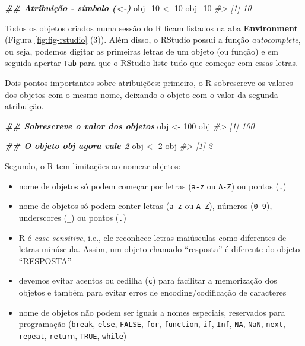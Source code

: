 \documentclass[
]{book}
\newenvironment{Shaded}{\begin{snugshade}}{\end{snugshade}}
\newcommand{\CommentTok}[1]{\textcolor[rgb]{0.37,0.37,0.37}{\textit{#1}}}
\newcommand{\DecValTok}[1]{\textcolor[rgb]{0.06,0.06,0.06}{#1}}
\newcommand{\DocumentationTok}[1]{\textcolor[rgb]{0.37,0.37,0.37}{\textbf{\textit{#1}}}}
\newcommand{\NormalTok}[1]{#1}
\newcommand{\OtherTok}[1]{\textcolor[rgb]{0.37,0.37,0.37}{#1}}
\providecommand{\tightlist}{%
  \setlength{\itemsep}{0pt}\setlength{\parskip}{0pt}}
\begin{document}
\begin{Shaded}
\begin{Highlighting}[]
\DocumentationTok{\#\# Atribuição {-} símbolo (\textless{}{-})}
\NormalTok{obj\_10 }\OtherTok{\textless{}{-}} \DecValTok{10}
\NormalTok{obj\_10}
\CommentTok{\#\textgreater{} [1] 10}
\end{Highlighting}
\end{Shaded}

Todos os objetos criados numa sessão do R ficam listados na aba \textbf{Environment} (Figura \ref{fig:fig-rstudio} (3)). Além disso, o RStudio possui a função \emph{autocomplete}, ou seja, podemos digitar as primeiras letras de um objeto (ou função) e em seguida apertar \texttt{Tab} para que o RStudio liste tudo que começar com essas letras.

Dois pontos importantes sobre atribuições: primeiro, o R sobrescreve os valores dos objetos com o mesmo nome, deixando o objeto com o valor da segunda atribuição.

\begin{Shaded}
\begin{Highlighting}[]
\DocumentationTok{\#\# Sobrescreve o valor dos objetos}
\NormalTok{obj }\OtherTok{\textless{}{-}} \DecValTok{100}
\NormalTok{obj}
\CommentTok{\#\textgreater{} [1] 100}

\DocumentationTok{\#\# O objeto \textquotesingle{}obj\textquotesingle{} agora vale 2}
\NormalTok{obj }\OtherTok{\textless{}{-}} \DecValTok{2}
\NormalTok{obj}
\CommentTok{\#\textgreater{} [1] 2}
\end{Highlighting}
\end{Shaded}

Segundo, o R tem limitações ao nomear objetos:

\begin{itemize}
\tightlist
\item
  nome de objetos só podem começar por letras (\texttt{a-z} ou \texttt{A-Z}) ou pontos (\texttt{.})
\item
  nome de objetos só podem conter letras (\texttt{a-z} ou \texttt{A-Z}), números (\texttt{0-9}), underscores (\texttt{\_}) ou pontos (\texttt{.})
\item
  R é \emph{case-sensitive}, i.e., ele reconhece letras maiúsculas como diferentes de letras minúscula. Assim, um objeto chamado ``resposta'' é diferente do objeto ``RESPOSTA''
\item
  devemos evitar acentos ou cedilha (\texttt{ç}) para facilitar a memorização dos objetos e também para evitar erros de encoding/codificação de caracteres
\item
  nome de objetos não podem ser iguais a nomes especiais, reservados para programação (\texttt{break}, \texttt{else}, \texttt{FALSE}, \texttt{for}, \texttt{function}, \texttt{if}, \texttt{Inf}, \texttt{NA}, \texttt{NaN}, \texttt{next}, \texttt{repeat}, \texttt{return}, \texttt{TRUE}, \texttt{while})
\end{itemize}
\end{document}
